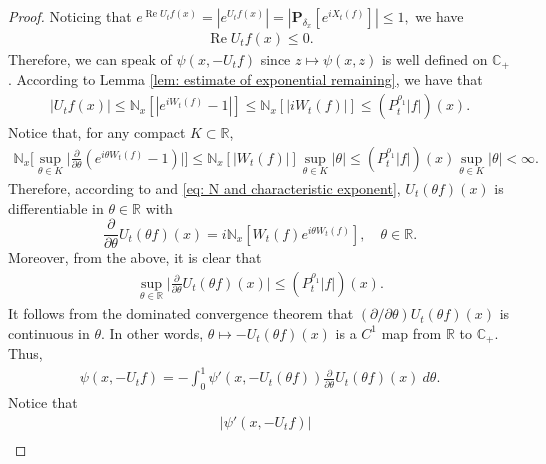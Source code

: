 \documentclass[12pt,a4paper]{amsart}
\theoremstyle{plain}
\theoremstyle{definition}
\numberwithin{equation}{section}
\begin{document}
\begin{proof}
  Noticing that
 $
     e^{\operatorname{Re} U_tf(x)}
    = |e^{U_tf(x)}|
    = |\mathbf P_{\delta_x}[e^{i X_t(f)}]|
    \leq 1,
$
  we have
  \begin{align}
    \label{eq: -v has positive real part}
    \operatorname{Re} U_tf(x)
    \leq 0.
  \end{align}
  Therefore, we can speak of $\psi(x,-U_tf)$ since $z\mapsto \psi(x,z)$ is well defined on $\mathbb C_+$.
  According to Lemma \ref{lem: estimate of exponential remaining}, we have that
  \begin{align}
    \label{eq: upper bound for vf}
    |U_tf(x)|
    \leq \mathbb N_x[|e^{i W_t(f)} - 1|]
    \leq \mathbb N_x[|i W_t(f)|]
    \leq (P^{\rho_1}_t |f|)(x).
  \end{align}
  Notice that, for any compact $K \subset \mathbb R$,
  \begin{align}
    \label{eq: estimate of deriavetive of v(theta)}
    \mathbb N_x \Big[\sup_{\theta \in K} \Big|\frac{\partial}{\partial \theta} (e^{i\theta W_t(f)} - 1) \Big|\Big]
    \leq \mathbb N_x[|W_t(f)|] \sup_{\theta \in K}|\theta|
    \leq (P^{\rho_1}_t |f|)(x) \sup_{\theta \in K}|\theta| < \infty.
  \end{align}
  Therefore, according to \cite[Theorem A.5.2]{Durrett2010Probability} and \eqref{eq: N and characteristic exponent}, $ U_t( \theta f)( x )$ is differentiable in $\theta \in \mathbb R$ with
  \[
    \frac{\partial}{\partial \theta} U_t(\theta f)(x)
    = i\mathbb N_x[W_t(f) e^{i\theta W_t(f)}],
    \quad \theta \in \mathbb R.
  \]
  Moreover, from the above, it is clear that
  \begin{align}
    \label{eq: upper bounded for derivative of v(theta)}
    \sup_{\theta \in \mathbb R}\Big| \frac{\partial}{\partial \theta}U_t(\theta f)(x)\Big|
    \leq ( P^{\rho_1}_t |f|)(x).
  \end{align}
  It follows from the dominated convergence theorem that $(\partial/\partial \theta)U_t(\theta f)(x)$ is continuous in $\theta$.
  In other words, $\theta \mapsto -U_t(\theta f)(x)$ is a $C^1$ map from $\mathbb R$ to $\mathbb C_+$.
  Thus,
  \begin{align}
    \label{eq: path integration representation of psi(v)}
    \psi(x,-U_tf)
    = -\int_0^1 \psi' (x,-U_t(\theta f) ) \frac{\partial}{\partial \theta} U_t(\theta f)(x)~d\theta.
  \end{align}
  Notice that
  \begin{align}
    & |\psi'(x, -U_tf)| \\

\end{align}
\end{proof}
\end{document}
